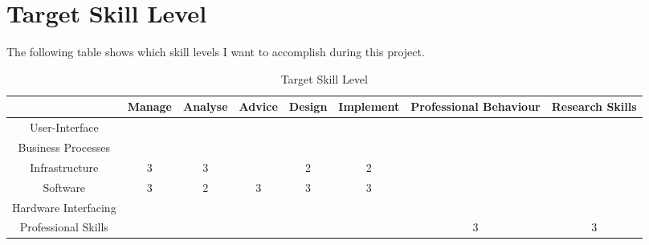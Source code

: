 
\section{Target Skill Level}
\label{sec:target}

The following table shows which skill levels I want to accomplish during this project.

\begin{table}[H]
	\centering
	\begin{tabular}{|c|c|c|c|c|c|c|c|}
		\hline
		& Manage & Analyse & Advice & Design & Implement & Professional Behaviour & Research Skills \\ \hline
		User-Interface & & & & & & & \\ \hline
		Business Processes & & & & & & & \\ \hline
		Infrastructure & \cellcolor[HTML]{FD6864}3 & \cellcolor[HTML]{FD6864}3 & & 2 & 2 & & \\ \hline
		Software & \cellcolor[HTML]{FD6864}3 & 2 & 3 & \cellcolor[HTML]{FD6864}3 & \cellcolor[HTML]{FD6864}3 & & \\ \hline
		Hardware Interfacing & & & & & & & \\ \hline
		Professional Skills & & & & & & \cellcolor[HTML]{FD6864}3 & 3 \\ \hline             
	\end{tabular}
	\caption{Target Skill Level}
	\label{targetskills}
\end{table}

